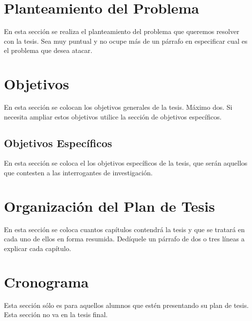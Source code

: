 \section{Planteamiento del Problema}

En esta sección se realiza el planteamiento del problema que queremos resolver con la tesis. Sea muy puntual y no ocupe más de un párrafo en especificar cual es el problema que desea atacar.

\section{Objetivos}

En esta sección se colocan los objetivos generales de la tesis. Máximo dos. Si necesita ampliar estos objetivos utilice la sección de objetivos específicos.

\subsection{Objetivos Específicos}

En esta sección se coloca el los objetivos específicos de la tesis, que serán aquellos que contesten a las
interrogantes de investigación.

\section{Organización del Plan de  Tesis}

En esta sección se coloca cuantos capítulos contendrá la tesis y que se tratará en cada uno de
ellos en forma resumida. Dedíquele un párrafo de dos o tres líneas a explicar cada capítulo.

\section{Cronograma}

Esta sección sólo es para aquellos alumnos que estén presentando su plan de tesis. Esta sección no va
en la tesis final.
